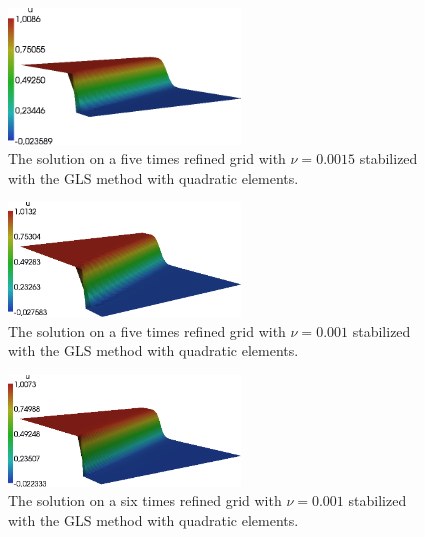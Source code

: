 \documentclass[a4paper, 11pt, twoside]{article}
\begin{document}
\begin{figure}[htbp]
\begin{center}
\includegraphics[width=0.55\textwidth]{fig/GLS_5_0,0015.png}
\caption{The solution on a five times refined grid with $\nu = 0.0015$ stabilized with the GLS method with quadratic elements.}
\label{GLSreflevel5_nu0,0015}
\end{center}
\end{figure}

\begin{figure}[htbp]
\begin{center}
\includegraphics[width=0.55\textwidth]{fig/GLS_5_0,001_quad.png}
\caption{The solution on a five times refined grid with $\nu = 0.001$ stabilized with the GLS method with quadratic elements.}
\label{GLSreflevel5_nu0,001}
\end{center}
\end{figure}

\begin{figure}[htbp]
\begin{center}
\includegraphics[width=0.55\textwidth]{fig/GLS_6_0,001_quad.png}
\caption{The solution on a six times refined grid with $\nu = 0.001$ stabilized with the GLS method with quadratic elements.}
\label{GLSreflevel6_nu0,001}
\end{center}
\end{figure}
\end{document}
